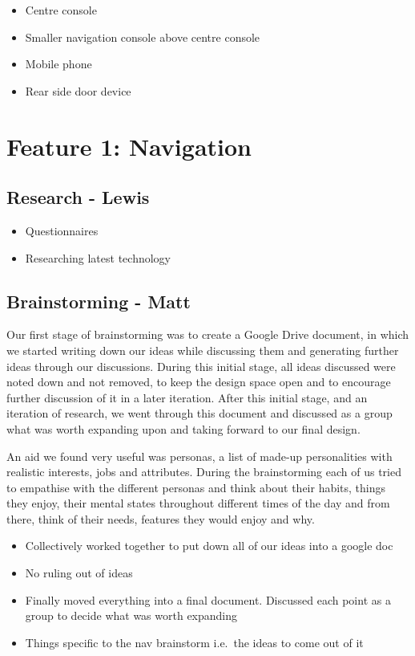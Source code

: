 \documentclass{article}
\begin{document}
\begin{itemize}
  \item Centre console
  \item Smaller navigation console above centre console
  \item Mobile phone
  \item Rear side door device
\end{itemize}




%
%
\section{Feature 1: Navigation}\label{sec:nav}

\subsection{Research - Lewis}\label{ssec:nav-research}
\begin{itemize}
  \item Questionnaires
  \item Researching latest technology
\end{itemize}

\subsection{Brainstorming - Matt}\label{ssec:nav-brainstorming}
Our first stage of brainstorming was to create a Google Drive document, in which we started writing down our ideas while discussing them and generating further ideas through our discussions. During this initial stage, all ideas discussed were noted down and not removed, to keep the design space open and to encourage further discussion of it in a later iteration. After this initial stage, and an iteration of research, we went through this document and discussed as a group what was worth expanding upon and taking forward to our final design.

An aid we found very useful was personas, a list of made-up personalities with realistic interests, jobs and attributes. During the brainstorming each of us tried to empathise with the different personas and think about their habits, things they enjoy, their mental states throughout different times of the day and from there, think of their needs, features they would enjoy and why.
\begin{itemize}
  \item Collectively worked together to put down all of our ideas into a google doc
  \item No ruling out of ideas
  \item Finally moved everything into a final document. Discussed each point as a group to decide what was worth expanding
  \item Things specific to the nav brainstorm i.e.\ the ideas to come out of it
\end{itemize}
\end{document}
